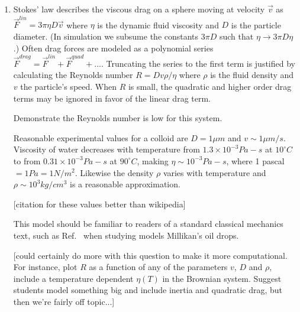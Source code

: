 \documentclass[twocolumn,preprintnumbers,amsmath,amssymb,aps,prx]{revtex4}
\begin{document}
\begin{enumerate}
\item Stokes' law describes the viscous drag on a sphere
  moving at velocity $\vec{v}$ as 
  $\vec{F}^{lin} = 3 \pi \eta D \vec{v}$ \cite{}
  where $\eta$ is the dynamic fluid viscosity and 
  $D$ is the particle diameter.
  (In simulation we
  subsume the constants $3 \pi D$
  such that $\eta \rightarrow 3 \pi D \eta$.)
  Often drag forces are
  modeled as a polynomial series
  $\vec{F}^{drag} = \vec{F}^{lin} + \vec{F}^{quad} + ... $.
  Truncating the series to the first term
  is justified by calculating the Reynolds number  
  $R = D v \rho / \eta$
  where $\rho$ is the fluid density and $v$ the particle's speed.
  When $R$ is small, the quadratic and higher order drag terms
  may be ignored in favor of the linear drag term.

  Demonstrate the Reynolds number is low
  for this system.
  
  Reasonable experimental values for
  a colloid are $D = 1 \mu m$ and $v \sim 1 \mu m /s$.
  Viscosity of water decreases with temperature
  from $1.3 \times 10^{-3} Pa-s$ at $10^{\circ}C$ to 
  from $0.31 \times 10^{-3} Pa-s$ at $90^{\circ}C$,
  making $\eta \sim 10^{-3} Pa-s$,
  where 1 pascal $ = 1 Pa = 1 N/m^2$.
  Likewise the density $\rho$ varies with temperature
  and $\rho \sim 10^3 kg/cm^3$ is a reasonable approximation.
  
  [citation for these values better than wikipedia] \cite{} %

This model should be familiar to readers
of a standard classical mechanics text, such as Ref.~\cite{Taylor2005}
when studying 
models Millikan's oil drops.

[could certainly do more with this question to make it more computational.  For instance, plot $R$ as a function of any of the parameters $v$, $D$ and $\rho$, include a temperature dependent $\eta(T)$ in the Brownian system.  Suggest students model something big and include inertia and quadratic drag, but then we're fairly off topic...]

\label{ex:reynolds}


\end{enumerate}
\end{document}

